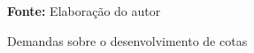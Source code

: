 \begin{figure}[ht!]
\centering

\caption{\textmd{Demandas sobre o desenvolvimento de cotas}}
\label{fig:trello}

\par\medskip\textbf{Fonte:} Elaboração do autor \par\medskip

\end{figure}

